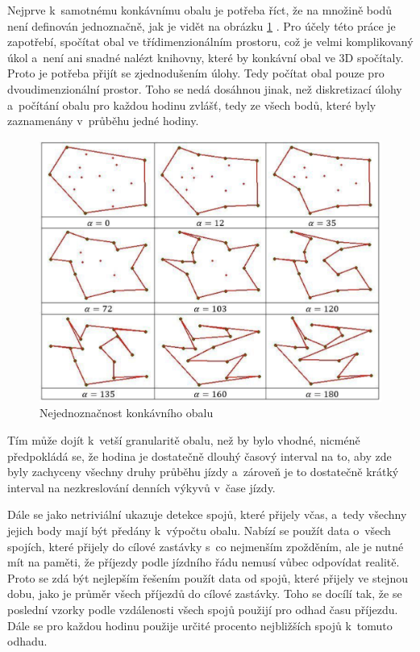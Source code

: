 Nejprve k~samotnému konkávnímu obalu je potřeba říct, že na množině bodů není definován jednoznačně, jak je vidět na obrázku \ref{fig:konkavni_obal_nejednoznacny} \citet{Asaeedi}. Pro účely této práce je zapotřebí, spočítat obal ve třídimenzionálním prostoru, což je velmi komplikovaný úkol a~není ani snadné nalézt knihovny, které by konkávní obal ve 3D spočítaly. Proto je potřeba přijít se zjednodušením úlohy. Tedy počítat obal pouze pro dvoudimenzionální prostor. Toho se nedá dosáhnou jinak, než diskretizací úlohy a~počítání obalu pro každou hodinu zvlášť, tedy ze všech bodů, které byly zaznamenány v~průběhu jedné hodiny.


\begin{figure}
\centering
  \includegraphics[width=0.8\linewidth]{../img/konkavni_obal_nejednoznacny.png}
  \caption{Nejednoznačnost konkávního obalu}
  \label{fig:konkavni_obal_nejednoznacny}
\end{figure}


\bigbreak

 Tím může dojít k~vetší granularitě obalu, než by bylo vhodné, nicméně předpokládá se, že hodina je dostatečně dlouhý časový interval na to, aby zde byly zachyceny všechny druhy průběhu jízdy a~zároveň je to dostatečně krátký interval na nezkreslování denních výkyvů v~čase jízdy.


 \bigbreak

Dále se jako netriviální ukazuje detekce spojů, které přijely včas, a~tedy všechny jejich body mají být předány k~výpočtu obalu. Nabízí se použít data o~všech spojích, které přijely do cílové zastávky s~co nejmenším zpožděním, ale je nutné mít na paměti, že příjezdy podle jízdního řádu nemusí vůbec odpovídat realitě. Proto se zdá být nejlepším řešením použít data od spojů, které přijely ve stejnou dobu, jako je průměr všech příjezdů do cílové zastávky. Toho se docílí tak, že se poslední vzorky podle vzdálenosti všech spojů použijí pro odhad času příjezdu. Dále se pro každou hodinu použije určité procento nejbližších spojů k~tomuto odhadu.


